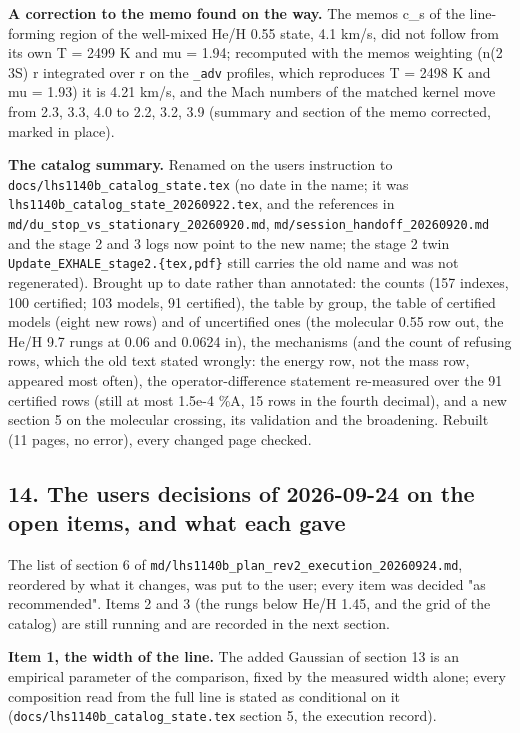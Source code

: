 \documentclass[english,a4paper]{my_memo}
\begin{document}
\textbf{A correction to the memo found on the way.} The memo\textquotesingle s c\_s of the
line-forming region of the well-mixed He/H 0.55 state, 4.1 km/s, did not
follow from its own T = 2499 K and mu = 1.94; recomputed with the memo\textquotesingle s
weighting (n(2 3S) r integrated over r on the \texttt{\_adv} profiles, which
reproduces T = 2498 K and mu = 1.93) it is 4.21 km/s, and the Mach numbers of
the matched kernel move from 2.3, 3.3, 4.0 to 2.2, 3.2, 3.9 (summary and
section of the memo corrected, marked in place).

\textbf{The catalog summary.} Renamed on the user\textquotesingle s instruction to
\texttt{docs/lhs1140b\_catalog\_state.tex} (no date in the name; it was
\texttt{lhs1140b\_catalog\_state\_20260922.tex}, and the references in
\texttt{md/du\_stop\_vs\_stationary\_20260920.md}, \texttt{md/session\_handoff\_20260920.md}
and the stage 2 and 3 logs now point to the new name; the stage 2 twin
\texttt{Update\_EXHALE\_stage2.\{tex,pdf\}} still carries the old name and was not
regenerated). Brought up to date rather than annotated: the counts (157
indexes, 100 certified; 103 models, 91 certified), the table by group, the
table of certified models (eight new rows) and of uncertified ones (the
molecular 0.55 row out, the He/H 9.7 rungs at 0.06 and 0.0624 in), the
mechanisms (and the count of refusing rows, which the old text stated
wrongly: the energy row, not the mass row, appeared most often), the
operator-difference statement re-measured over the 91 certified rows (still
at most 1.5e-4 \%A, 15 rows in the fourth decimal), and a new section 5 on the
molecular crossing, its validation and the broadening. Rebuilt (11 pages, no
error), every changed page checked.

\subsection{14. The user\textquotesingle s decisions of 2026-09-24 on the open items, and what each gave}\label{14-the-users-decisions-of-2026-09-24-on-the-open-items-and-what-each-gave}

The list of section 6 of \texttt{md/lhs1140b\_plan\_rev2\_execution\_20260924.md},
reordered by what it changes, was put to the user; every item was decided
"as recommended". Items 2 and 3 (the rungs below He/H 1.45, and the grid of
the catalog) are still running and are recorded in the next section.

\textbf{Item 1, the width of the line.} The added Gaussian of section 13 is an
empirical parameter of the comparison, fixed by the measured width alone;
every composition read from the full line is stated as conditional on it
(\texttt{docs/lhs1140b\_catalog\_state.tex} section 5, the execution record).
\end{document}
